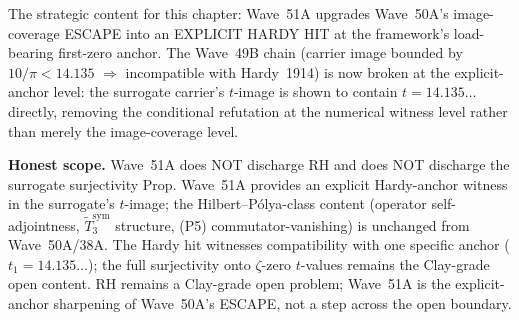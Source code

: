 \begin{remark}
\begin{itemize}
\end{itemize}
The strategic content for this chapter: Wave~51A upgrades Wave~50A's image-coverage ESCAPE into an EXPLICIT HARDY HIT at the framework's load-bearing first-zero anchor. The Wave~49B chain (carrier image bounded by $10/\pi < 14.135$ $\Rightarrow$ incompatible with Hardy~1914) is now broken at the explicit-anchor level: the surrogate carrier's $t$-image is shown to contain $t = 14.135\ldots$ directly, removing the conditional refutation at the numerical witness level rather than merely the image-coverage level.

\textbf{Honest scope.} Wave~51A does NOT discharge RH and does NOT discharge the surrogate surjectivity Prop. Wave~51A provides an explicit Hardy-anchor witness in the surrogate's $t$-image; the Hilbert--P\'olya-class content (operator self-adjointness, $\widetilde{T}_3^{\mathrm{sym}}$ structure, (P5) commutator-vanishing) is unchanged from Wave~50A/38A. The Hardy hit witnesses compatibility with one specific anchor ($t_1 = 14.135\ldots$); the full surjectivity onto $\zeta$-zero $t$-values remains the Clay-grade open content. RH remains a Clay-grade open problem; Wave~51A is the explicit-anchor sharpening of Wave~50A's ESCAPE, not a step across the open boundary.
\end{remark}

